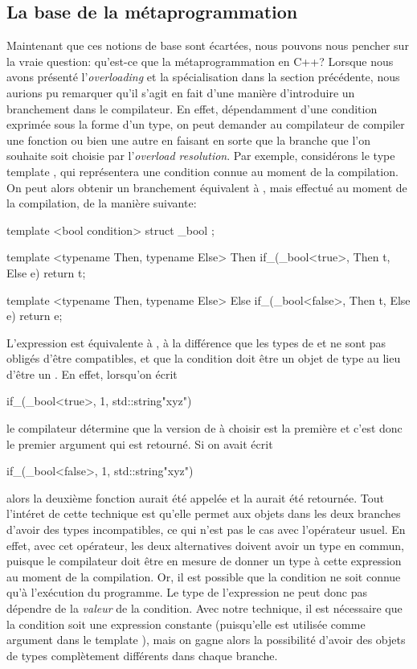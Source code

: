 \subsection{La base de la métaprogrammation}
Maintenant que ces notions de base sont écartées, nous pouvons nous pencher
sur la vraie question: qu'est-ce que la métaprogrammation en C++? Lorsque nous
avons présenté l'\textit{overloading} et la spécialisation dans la section
précédente, nous aurions pu remarquer qu'il s'agit en fait d'une manière
d'introduire un branchement dans le compilateur. En effet, dépendamment
d'une condition exprimée sous la forme d'un type, on peut demander au
compilateur de compiler une fonction ou bien une autre en faisant en sorte
que la branche que l'on souhaite soit choisie par l'\textit{overload resolution}.
Par exemple, considérons le type template , qui représentera une
condition connue au moment de la compilation. On peut alors obtenir un
branchement équivalent à , mais effectué au moment de
la compilation, de la manière suivante:
\begin{cpp}
    template <bool condition>
    struct _bool { };

    template <typename Then, typename Else>
    Then if_(_bool<true>, Then t, Else e) { return t; }

    template <typename Then, typename Else>
    Else if_(_bool<false>, Then t, Else e) { return e; }
\end{cpp}

L'expression  est équivalente à ,
à la différence que les types de  et  ne sont pas obligés d'être
compatibles, et que la condition doit être un objet de type 
au lieu d'être un . En effet, lorsqu'on écrit
\begin{cpp}
    if_(_bool<true>{}, 1, std::string{"xyz"})
\end{cpp}
le compilateur détermine que la version de  à choisir est la première
et c'est donc le premier argument qui est retourné. Si on avait écrit
\begin{cpp}
    if_(_bool<false>{}, 1, std::string{"xyz"})
\end{cpp}
alors la deuxième fonction aurait été appelée et la  aurait
été retournée. Tout l'intéret de cette technique est qu'elle permet aux objets
dans les deux branches d'avoir des types incompatibles, ce qui n'est pas le cas
avec l'opérateur  usuel. En effet, avec cet opérateur, les deux
alternatives doivent avoir un type en commun, puisque le compilateur doit être
en mesure de donner un type à cette expression au moment de la compilation. Or,
il est possible que la condition ne soit connue qu'à l'exécution du programme.
Le type de l'expression ne peut donc pas dépendre de la \textit{valeur} de la
condition. Avec notre technique, il est nécessaire que la condition soit une
expression constante (puisqu'elle est utilisée comme argument dans le template
), mais on gagne alors la possibilité d'avoir des objets de types
complètement différents dans chaque branche.

